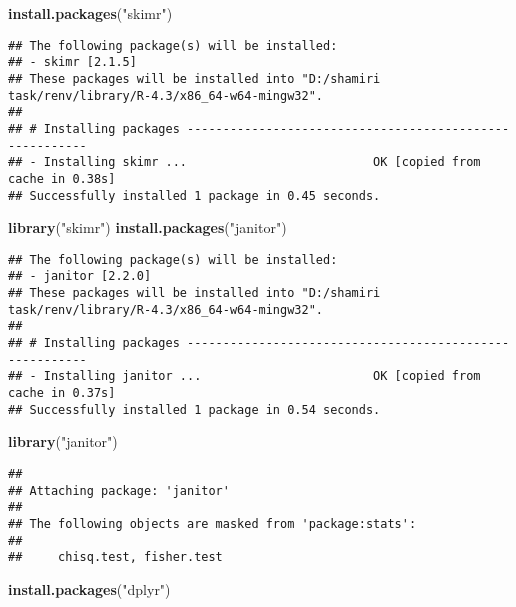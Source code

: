 \documentclass[
]{article}
\newenvironment{Shaded}{\begin{snugshade}}{\end{snugshade}}
\newcommand{\FunctionTok}[1]{\textcolor[rgb]{0.13,0.29,0.53}{\textbf{#1}}}
\newcommand{\NormalTok}[1]{#1}
\newcommand{\StringTok}[1]{\textcolor[rgb]{0.31,0.60,0.02}{#1}}
\begin{document}
\begin{Shaded}
\begin{Highlighting}[]
\FunctionTok{install.packages}\NormalTok{(}\StringTok{"skimr"}\NormalTok{)}
\end{Highlighting}
\end{Shaded}

\begin{verbatim}
## The following package(s) will be installed:
## - skimr [2.1.5]
## These packages will be installed into "D:/shamiri task/renv/library/R-4.3/x86_64-w64-mingw32".
## 
## # Installing packages --------------------------------------------------------
## - Installing skimr ...                          OK [copied from cache in 0.38s]
## Successfully installed 1 package in 0.45 seconds.
\end{verbatim}

\begin{Shaded}
\begin{Highlighting}[]
\FunctionTok{library}\NormalTok{(}\StringTok{"skimr"}\NormalTok{)}
\FunctionTok{install.packages}\NormalTok{(}\StringTok{"janitor"}\NormalTok{)}
\end{Highlighting}
\end{Shaded}

\begin{verbatim}
## The following package(s) will be installed:
## - janitor [2.2.0]
## These packages will be installed into "D:/shamiri task/renv/library/R-4.3/x86_64-w64-mingw32".
## 
## # Installing packages --------------------------------------------------------
## - Installing janitor ...                        OK [copied from cache in 0.37s]
## Successfully installed 1 package in 0.54 seconds.
\end{verbatim}

\begin{Shaded}
\begin{Highlighting}[]
\FunctionTok{library}\NormalTok{(}\StringTok{"janitor"}\NormalTok{)}
\end{Highlighting}
\end{Shaded}

\begin{verbatim}
## 
## Attaching package: 'janitor'
## 
## The following objects are masked from 'package:stats':
## 
##     chisq.test, fisher.test
\end{verbatim}

\begin{Shaded}
\begin{Highlighting}[]
\FunctionTok{install.packages}\NormalTok{(}\StringTok{"dplyr"}\NormalTok{)}
\end{Highlighting}
\end{Shaded}
\end{document}
